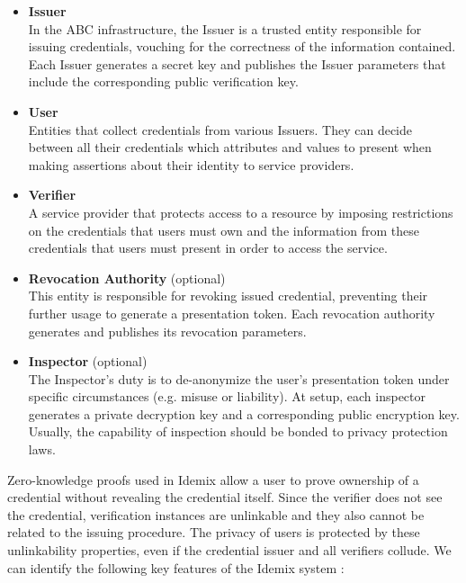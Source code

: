 \begin{itemize}
	\item \textbf{Issuer}\\
	In the ABC infrastructure, the Issuer is a trusted entity responsible for issuing credentials, vouching for the correctness of the information contained. Each Issuer generates a secret key and publishes the Issuer parameters that include the corresponding public verification key.
	
	\item \textbf{User}\\
	Entities that collect credentials from various Issuers. They can decide between all their credentials which attributes and values to present when making assertions about their identity to service providers.
	
	\item \textbf{Verifier}\\
	A service provider that protects access to a resource by imposing restrictions on the credentials that users must own and the information from these credentials that users must present in order to access the service.
	
	\item \textbf{Revocation Authority} (optional)\\
	This entity is responsible for revoking issued credential, preventing their further usage to generate a presentation token. Each revocation authority generates and publishes its revocation parameters.
	
	\item \textbf{Inspector} (optional)\\
	The Inspector's duty is to de-anonymize the user's presentation token under specific circumstances (e.g. misuse or liability). At setup, each inspector generates a private decryption key and a corresponding public encryption key. Usually, the capability of inspection should be bonded to privacy protection laws.
	
\end{itemize}

Zero-knowledge proofs used in Idemix allow a user to prove ownership of a credential without
revealing the credential itself. Since the verifier does not see the credential, verification
instances are unlinkable and they also cannot be related to the issuing procedure. The privacy of users is protected by these unlinkability properties, even if the credential issuer and all verifiers collude. We can identify the following key features of the Idemix system \citep{vanet}:

